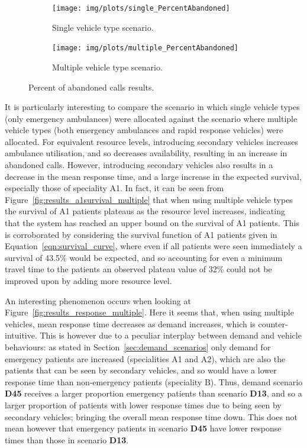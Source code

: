 \documentclass[numbers,webpdf,imaman]{ima-authoring-template}%
\begin{document}
\begin{figure}[htb!]
\begin{center}
\begin{subfigure}{0.4\textwidth}
\texttt{[image: img/plots/single\_PercentAbandoned]}
\caption{Single vehicle type scenario.}
\label{fig:results_abandoned_single}
\end{subfigure}
\begin{subfigure}{0.4\textwidth}
\texttt{[image: img/plots/multiple\_PercentAbandoned]}
\caption{Multiple vehicle type scenario.}
\label{fig:results_abandoned_multiple}
\end{subfigure} 
\end{center}
\caption{Percent of abandoned calls results.}
\end{figure}

It is particularly interesting to compare the scenario in which single vehicle
types (only emergency ambulances) were allocated against the scenario where
multiple vehicle types (both emergency ambulances and rapid response vehicles)
were allocated. For equivalent resource levels, introducing secondary vehicles
increases ambulance utilisation, and so decreases availability, resulting in
an increase in abandoned calls. However, introducing secondary vehicles also
results in a decrease in the mean response time, and a large increase in the
expected survival, especially those of speciality A1.
In fact, it can be seen from Figure~\ref{fig:results_a1survival_multiple} that when using multiple vehicle types the survival of 
A1 patients plateaus as the resource level increases, indicating that the system has reached an upper bound on the survival of A1 patients. 
This is corroborated by considering the survival function of A1 patients given in Equation~\ref{eqn:survival_curve}, where even if all 
patients were seen immediately a survival of 43.5\% would be expected, and so accounting for even a minimum travel time to the patients an 
observed plateau value of 32\% could not be improved upon by adding more resource level.

An interesting phenomenon occurs when looking at
Figure~\ref{fig:results_response_multiple}. Here it seems that, when using
multiple vehicles, mean response time decreases as demand increases, which is
counter-intuitive. This is however due to a peculiar interplay between demand
and vehicle behaviours: as stated in
Section~\ref{sec:demand_scenarios} only demand for emergency patients are
increased (specialities A1 and A2), which are also the patients that can be seen
by secondary vehicles, and so would have a lower response time than
non-emergency patients (speciality B). Thus, demand scenario \textbf{D45}
receives a larger proportion emergency patients than scenario \textbf{D13}, and
so a larger proportion of patients with lower response times due to being seen
by secondary vehicles; bringing the overall mean response time down. This does
not mean however that emergency patients in scenario \textbf{D45} have lower
response times than those in scenario \textbf{D13}.
\end{document}

